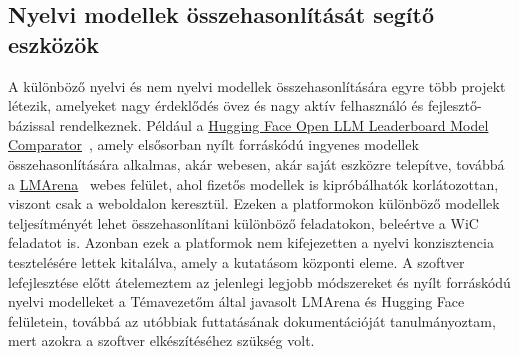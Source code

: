 \documentclass[12pt]{report}
\begin{document}
    \subsection{Nyelvi modellek összehasonlítását segítő eszközök}
    A különböző nyelvi és nem nyelvi modellek összehasonlítására egyre több projekt létezik, amelyeket nagy érdeklődés övez és nagy aktív felhasználó és fejlesztő-bázissal rendelkeznek. Például a \href{https://huggingface.co/spaces/open-llm-leaderboard/comparator}{Hugging Face Open LLM Leaderboard Model Comparator}~\cite{hf_llm_comparator}, amely elsősorban nyílt forráskódú ingyenes modellek összehasonlítására alkalmas, akár webesen, akár saját eszközre telepítve, továbbá a \href{https://lmarena.ai/}{LMArena}~\cite{chiang2024chatbot} webes felület, ahol fizetős modellek is kipróbálhatók korlátozottan, viszont csak a weboldalon keresztül.
    Ezeken a platformokon különböző modellek teljesítményét lehet összehasonlítani különböző feladatokon, beleértve a WiC feladatot is.
    Azonban ezek a platformok nem kifejezetten a nyelvi konzisztencia tesztelésére lettek kitalálva, amely a kutatásom központi eleme.
    A szoftver lefejlesztése előtt átelemeztem az jelenlegi legjobb módszereket és nyílt forráskódú nyelvi modelleket a Témavezetőm által javasolt LMArena és Hugging Face felületein, továbbá az utóbbiak futtatásának dokumentációját tanulmányoztam, mert azokra a szoftver elkészítéséhez szükség volt.
\end{document}
